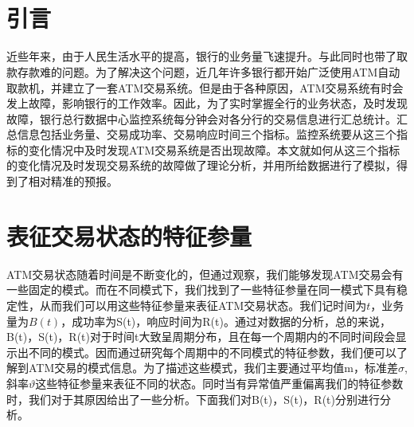 \documentclass[a4paper]{article}
\begin{document}
\begin{titlepage}



\end{titlepage}

\begin{Huge}
\end{Huge}
\begin{large}
	\begin{flushright}
		
	\end{flushright}
\end{large}
\ \ \\\\

\begin{abstract}
\textit{}
\end{abstract}

\newpage

\tableofcontents

\newpage

\part{引言}
近些年来，由于人民生活水平的提高，银行的业务量飞速提升。与此同时也带了取款存款难的问题。为了解决这个问题，近几年许多银行都开始广泛使用ATM自动取款机，并建立了一套ATM交易系统。但是由于各种原因，ATM交易系统有时会发上故障，影响银行的工作效率。因此，为了实时掌握全行的业务状态，及时发现故障，银行总行数据中心监控系统每分钟会对各分行的交易信息进行汇总统计。汇总信息包括业务量、交易成功率、交易响应时间三个指标。监控系统要从这三个指标的变化情况中及时发现ATM交易系统是否出现故障。本文就如何从这三个指标的变化情况及时发现交易系统的故障做了理论分析，并用所给数据进行了模拟，得到了相对精准的预报。

\part{表征交易状态的特征参量}
ATM交易状态随着时间是不断变化的，但通过观察，我们能够发现ATM交易会有一些固定的模式。而在不同模式下，我们找到了一些特征参量在同一模式下具有稳定性，从而我们可以用这些特征参量来表征ATM交易状态。我们记时间为$t$，业务量为$B(t)$，成功率为S(t)，响应时间为R(t)。通过对数据的分析，总的来说，B(t)，S(t)，R(t)对于时间t大致呈周期分布，且在每一个周期内的不同时间段会显示出不同的模式。因而通过研究每个周期中的不同模式的特征参数，我们便可以了解到ATM交易的模式信息。为了描述这些模式，我们主要通过平均值m，标准差$\sigma$,斜率$\vartheta$这些特征参量来表征不同的状态。同时当有异常值严重偏离我们的特征参数时，我们对于其原因给出了一些分析。下面我们对B(t)，S(t)，R(t)分别进行分析。
\end{document}
